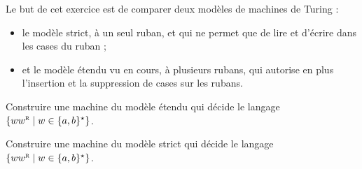 
\begingroup

\begin{exercice}\label{exo:turingmachines/expressiveness/models}

  Le but de cet exercice est de comparer deux modèles de machines de Turing :
  \begin{itemize}
    \item le modèle strict, à un seul ruban, et qui ne permet que de lire et d'écrire dans les cases du ruban ; 
    \item et le modèle étendu vu en cours, à plusieurs rubans, qui autorise en plus l'insertion et la suppression de cases sur les rubans.
  \end{itemize}

  \begin{questions}
  \item Construire une machine du modèle étendu qui décide le langage $\{ww^\textsc{r} \mid w \in \{a, b\}^\star\}$.
  \end{questions}
  \begin{corrections}
  \end{corrections}

  \begin{questions}
  \item Construire une machine du modèle strict qui décide le langage $\{ww^\textsc{r} \mid w \in \{a, b\}^\star\}$.
  \end{questions}
  \begin{corrections}
\end{corrections}
\end{exercice}

